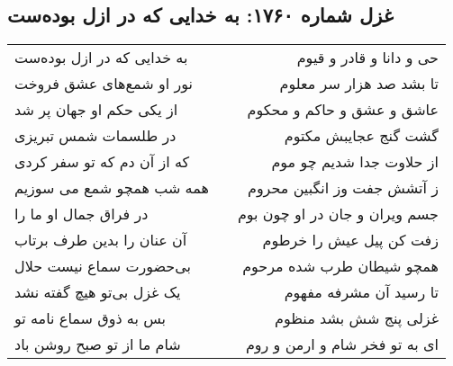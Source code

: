 \begin{center}
\section*{غزل شماره ۱۷۶۰: به خدایی که در ازل بوده‌ست}
\label{sec:1760}
\begin{longtable}{l p{0.5cm} r}
به خدایی که در ازل بوده‌ست
&&
حی و دانا و قادر و قیوم
\\
نور او شمع‌های عشق فروخت
&&
تا بشد صد هزار سر معلوم
\\
از یکی حکم او جهان پر شد
&&
عاشق و عشق و حاکم و محکوم
\\
در طلسمات شمس تبریزی
&&
گشت گنج عجایبش مکتوم
\\
که از آن دم که تو سفر کردی
&&
از حلاوت جدا شدیم چو موم
\\
همه شب همچو شمع می سوزیم
&&
ز آتشش جفت وز انگبین محروم
\\
در فراق جمال او ما را
&&
جسم ویران و جان در او چون بوم
\\
آن عنان را بدین طرف برتاب
&&
زفت کن پیل عیش را خرطوم
\\
بی‌حضورت سماع نیست حلال
&&
همچو شیطان طرب شده مرحوم
\\
یک غزل بی‌تو هیچ گفته نشد
&&
تا رسید آن مشرفه مفهوم
\\
بس به ذوق سماع نامه تو
&&
غزلی پنج شش بشد منظوم
\\
شام ما از تو صبح روشن باد
&&
ای به تو فخر شام و ارمن و روم
\\
\end{longtable}
\end{center}

